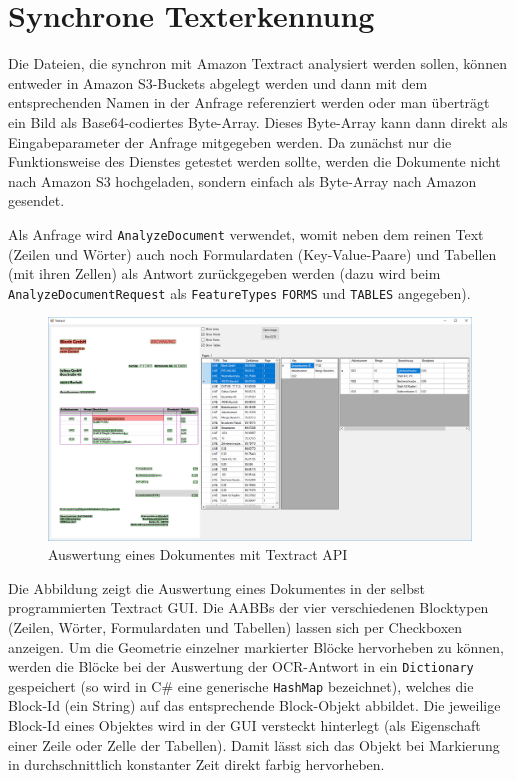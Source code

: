 \documentclass{whswinvcbook}
\begin{document}
\section{Synchrone Texterkennung}
Die Dateien, die synchron mit Amazon Textract analysiert werden sollen, können entweder in Amazon S3-Buckets abgelegt werden und dann mit dem entsprechenden Namen in der Anfrage referenziert werden oder man überträgt ein Bild als Base64-codiertes Byte-Array. Dieses Byte-Array kann dann direkt als Eingabeparameter der Anfrage mitgegeben werden. Da zunächst nur die Funktionsweise des Dienstes getestet werden sollte, werden die Dokumente nicht nach Amazon S3 hochgeladen, sondern einfach als Byte-Array nach Amazon gesendet.

Als Anfrage wird \texttt{AnalyzeDocument} verwendet, womit neben dem reinen Text (Zeilen und Wörter) auch noch Formulardaten (Key-Value-Paare) und Tabellen (mit ihren Zellen) als Antwort zurückgegeben werden (dazu wird beim \texttt{AnalyzeDocumentRequest} als \texttt{FeatureTypes} \texttt{FORMS} und \texttt{TABLES} angegeben).
\begin{figure}[H]
    \centering
    \includegraphics[width=1.0\textwidth]{img/textract_gui.png}
    \caption{Auswertung eines Dokumentes mit Textract API}
    \label{fig-textract-gui}
\end{figure}
Die Abbildung zeigt die Auswertung eines Dokumentes in der selbst programmierten Textract GUI. Die AABBs der vier verschiedenen Blocktypen (Zeilen, Wörter, Formulardaten und Tabellen) lassen sich per Checkboxen anzeigen. Um die Geometrie einzelner markierter Blöcke hervorheben zu können, werden die Blöcke bei der Auswertung der OCR-Antwort in ein \texttt{Dictionary} gespeichert (so wird in C\# eine generische \texttt{HashMap} bezeichnet), welches die Block-Id (ein String) auf das entsprechende Block-Objekt abbildet. Die jeweilige Block-Id eines Objektes wird in der GUI versteckt hinterlegt (als Eigenschaft einer Zeile oder Zelle der Tabellen). Damit lässt sich das Objekt bei Markierung in durchschnittlich konstanter Zeit direkt farbig hervorheben.
\end{document}
